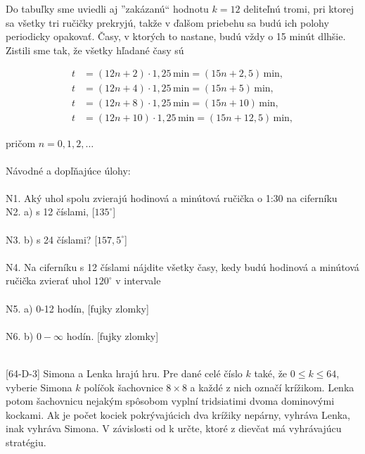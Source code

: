 Do tabuľky sme uviedli aj ”zakázanú“ hodnotu $k = 12$ deliteľnú tromi, pri ktorej sa všetky tri ručičky prekryjú, takže v ďalšom priebehu sa budú ich polohy periodicky opakovať. Časy, v ktorých to nastane, budú vždy o 15 minút dlhšie. Zistili sme tak, že
všetky hľadané časy sú
\begin{center}
\begin{align*}
t &= (12n + 2) \cdot 1, 25\,\text{min} =(15n + 2, 5)\,\text{min},\\
t &= (12n + 4) \cdot 1, 25\,\text{min}= (15n + 5)\,\text{min},\\
t &= (12n + 8) \cdot 1, 25\,\text{min}  = (15n + 10)\,\text{min},\\
t &= (12n + 10) \cdot 1, 25 \,\text{min} = (15n + 12, 5)\,\text{min},
\end{align*}
\end{center}
pričom $n = 0, 1, 2, \ldots$\\
\\
Návodné a dopľňajúce úlohy:\\
\\
N1. Aký uhol spolu zvierajú hodinová a minútová ručička o 1:30 na ciferníku\\
N2. a) s 12 číslami, [$135^{\circ}$]\\
\\
N3. b) s 24 číslami? [$157,5^{\circ}$]\\
\\
N4. Na ciferníku s 12 číslami nájdite všetky časy, kedy budú hodinová a minútová ručička zvierať uhol $120^{\circ}$ v intervale\\
\\
N5. a) 0-12 hodín, [fujky zlomky]\\
\\
N6. b) $0-\infty$ hodín. [fujky zlomky]\\
\\
\begin{tcolorbox}[breakable,notitle,boxrule=0pt,colback=light-gray,colframe=light-gray]\ul [64-D-3] Simona a Lenka hrajú hru. Pre dané celé číslo $k$ také, že $0 \leq k \leq 64$, vyberie Simona $k$ políčok šachovnice $8 \times 8$ a každé z nich označí krížikom. Lenka potom šachovnicu nejakým spôsobom vyplní tridsiatimi dvoma dominovými kockami. Ak je počet kociek pokrývajúcich dva krížiky nepárny, vyhráva Lenka, inak vyhráva Simona. V závislosti
od k určte, ktoré z dievčat má vyhrávajúcu stratégiu.

\end{tcolorbox}


